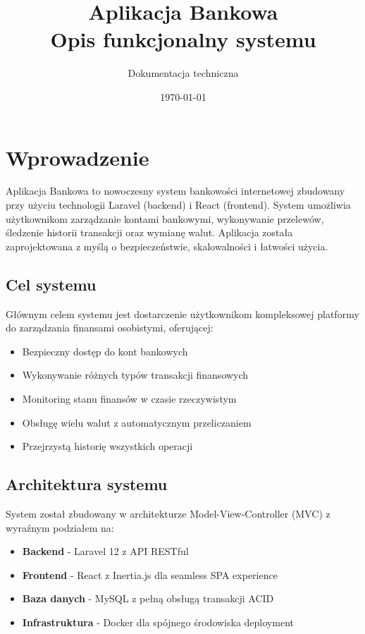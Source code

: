 \documentclass[12pt,a4paper]{article}
\title{\textbf{Aplikacja Bankowa}\\[0.5cm]\Large Opis funkcjonalny systemu}
\author{Dokumentacja techniczna}
\date{\today}
\begin{document}
    \maketitle
    \thispagestyle{empty}

    \newpage
    \tableofcontents
    \newpage

    \section{Wprowadzenie}

    Aplikacja Bankowa to nowoczesny system bankowości internetowej zbudowany przy użyciu technologii Laravel (backend) i React (frontend). System umożliwia użytkownikom zarządzanie kontami bankowymi, wykonywanie przelewów, śledzenie historii transakcji oraz wymianę walut. Aplikacja została zaprojektowana z myślą o bezpieczeństwie, skalowalności i łatwości użycia.

    \subsection{Cel systemu}

    Głównym celem systemu jest dostarczenie użytkownikom kompleksowej platformy do zarządzania finansami osobistymi, oferującej:
    \begin{itemize}
        \item Bezpieczny dostęp do kont bankowych
        \item Wykonywanie różnych typów transakcji finansowych
        \item Monitoring stanu finansów w czasie rzeczywistym
        \item Obsługę wielu walut z automatycznym przeliczaniem
        \item Przejrzystą historię wszystkich operacji
    \end{itemize}

    \subsection{Architektura systemu}

    System został zbudowany w architekturze Model-View-Controller (MVC) z wyraźnym podziałem na:
    \begin{itemize}
        \item \textbf{Backend} - Laravel 12 z API RESTful
        \item \textbf{Frontend} - React z Inertia.js dla seamless SPA experience
        \item \textbf{Baza danych} - MySQL z pełną obsługą transakcji ACID
        \item \textbf{Infrastruktura} - Docker dla spójnego środowiska deployment
    \end{itemize}
\end{document}
